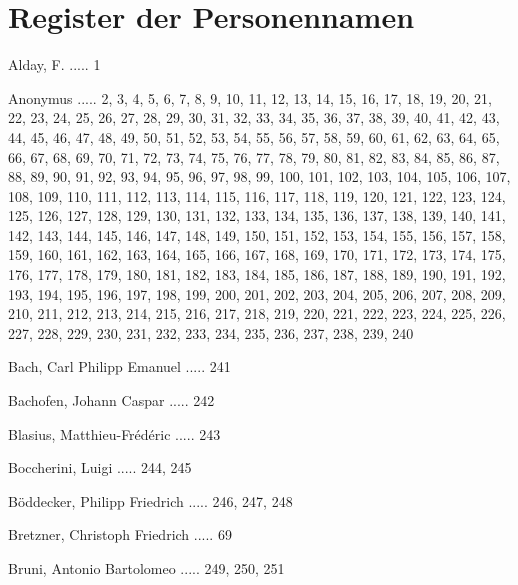\documentclass[twocolumn]{book}
\begin{document}
\chapter*{\centering Register der Personennamen}
\fancyhead{}


\newline 
Alday, F. ..... 1

\newline 
Anonymus ..... 2, 3, 4, 5, 6, 7, 8, 9, 10, 11, 12, 13, 14, 15, 16, 17, 18, 19, 20, 21, 22, 23, 24, 25, 26, 27, 28, 29, 30, 31, 32, 33, 34, 35, 36, 37, 38, 39, 40, 41, 42, 43, 44, 45, 46, 47, 48, 49, 50, 51, 52, 53, 54, 55, 56, 57, 58, 59, 60, 61, 62, 63, 64, 65, 66, 67, 68, 69, 70, 71, 72, 73, 74, 75, 76, 77, 78, 79, 80, 81, 82, 83, 84, 85, 86, 87, 88, 89, 90, 91, 92, 93, 94, 95, 96, 97, 98, 99, 100, 101, 102, 103, 104, 105, 106, 107, 108, 109, 110, 111, 112, 113, 114, 115, 116, 117, 118, 119, 120, 121, 122, 123, 124, 125, 126, 127, 128, 129, 130, 131, 132, 133, 134, 135, 136, 137, 138, 139, 140, 141, 142, 143, 144, 145, 146, 147, 148, 149, 150, 151, 152, 153, 154, 155, 156, 157, 158, 159, 160, 161, 162, 163, 164, 165, 166, 167, 168, 169, 170, 171, 172, 173, 174, 175, 176, 177, 178, 179, 180, 181, 182, 183, 184, 185, 186, 187, 188, 189, 190, 191, 192, 193, 194, 195, 196, 197, 198, 199, 200, 201, 202, 203, 204, 205, 206, 207, 208, 209, 210, 211, 212, 213, 214, 215, 216, 217, 218, 219, 220, 221, 222, 223, 224, 225, 226, 227, 228, 229, 230, 231, 232, 233, 234, 235, 236, 237, 238, 239, 240

\newline 
Bach, Carl Philipp Emanuel ..... 241

\newline 
Bachofen, Johann Caspar ..... 242

\newline 
Blasius, Matthieu-Frédéric ..... 243

\newline 
Boccherini, Luigi ..... 244, 245

\newline 
Böddecker, Philipp Friedrich ..... 246, 247, 248

\newline 
Bretzner, Christoph Friedrich ..... 69

\newline 
Bruni, Antonio Bartolomeo ..... 249, 250, 251
\end{document}

